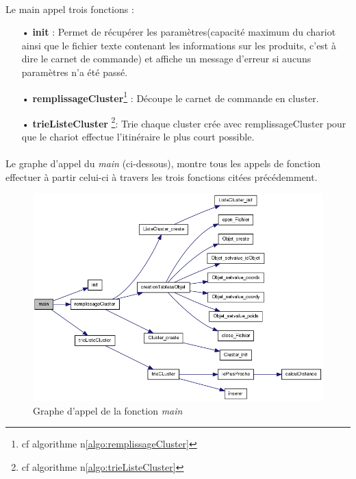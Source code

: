 \documentclass[twoside,UTF8]{EPURapport}
\begin{document}
\paragraph{}
Le main appel trois fonctions : 
\begin{itemize}
\item[•]\textbf{init} : Permet de récupérer les paramètres(capacité maximum du chariot ainsi que le fichier texte contenant les informations sur les produits, c'est à dire le carnet de commande) et affiche un message d'erreur si aucuns paramètres n'a été passé.
\item[•]\textbf{remplissageCluster}\footnote{cf algorithme n\degre \ref{algo:remplissageCluster}} : Découpe le carnet de commande en cluster.
\item[•]\textbf{trieListeCluster} \footnote{cf algorithme n\degre \ref{algo:trieListeCluster}}: Trie chaque cluster crée avec remplissageCluster pour que le chariot effectue l'itinéraire le plus court possible.
\end{itemize}

\paragraph{}
Le graphe d'appel du \textit{main} (ci-dessous), montre tous les appels de fonction effectuer à partir celui-ci à travers les trois fonctions citées précédemment.

\begin{figure}[H]
	\center
	\includegraphics[scale=0.5]{images/main_appel.png}
	\caption{Graphe d'appel de la fonction \textit{main}}
\end{figure}
\end{document}
